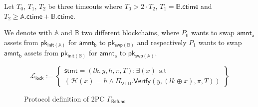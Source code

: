 \documentclass{article}      	%
\begin{document}



Let $T_0$, $T_1$, $T_2$ be three timeouts where  $T_0 > 2\cdot T_2$, $T_1 =  \mathbb{B}.\mathsf{ctime}$ and $T_2 \geq \mathbb{A}.\mathsf{ctime} + \mathbb{B}.\mathsf{ctime}$. 

We denote with $\mathbb{A}$ and $\mathbb{B}$ two different blockchains, where $P_0$ wants to swap $\mathsf{amnt_a}$ assets from $\mathsf{pk_{init(\mathbb{A})}}$ for $\mathsf{amnt_b}$ to $\mathsf{pk_{swp(\mathbb{B})}}$ and respectively $P_1$ wants to swap $\mathsf{amnt_b}$ assets from $\mathsf{pk_{init(\mathbb{B})}}$ for $\mathsf{amnt_a}$ to $\mathsf{pk_{swp(\mathbb{A})}}$.




\[
    \mathcal{L}_{\mathsf{lock}} := \left\{\begin{array}{lr}  \mathsf{stmt} = (lk, y, h, \pi, T) : \exists (x) \:\: \text{s.t} \\
    (\mathcal{H}(x) = h \land \Pi_\mathsf{VTD}.\mathsf{Verify}(y, (lk \oplus x), \pi, T)) \end{array}\right\}
\]

\begin{figure}[H]
\begin{pchstack}
\vspace{-1cm}
\end{pchstack}
\caption{Protocol definition of 2PC $\Gamma_{\mathsf{Refund}}$}
\end{figure}
\end{document}
